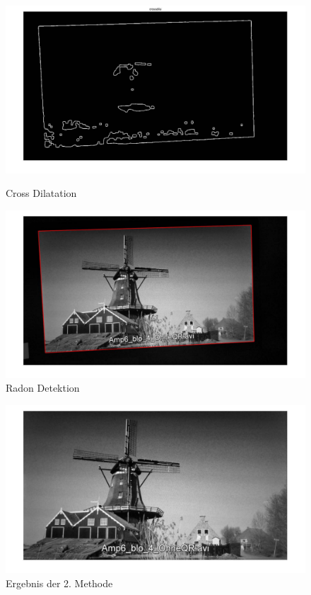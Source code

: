 \begin{figure}[H]
\centering 
\begin{minipage}[b]{0.49\textwidth} 
\centering 
\includegraphics[width=1.0\textwidth]{images/5_Implementirung/2/cd.pdf} 
\caption{Cross Dilatation}
\label{fig:cd}
\end{minipage}
\begin{minipage}[b]{0.49\textwidth} 
\centering 
\includegraphics[width=1.0\textwidth]{images/5_Implementirung/2/modulation.pdf}
\caption{Radon Detektion}
\label{fig:radon}
\end{minipage}
\end{figure}

\begin{figure}[H]
 \centering 
  \includegraphics[keepaspectratio,width=1.0\textwidth]{images/5_Implementirung/2/ergebnis.pdf}
 \caption{Ergebnis der 2. Methode}
 \label{fig:Ergebnis1}
\end{figure}

